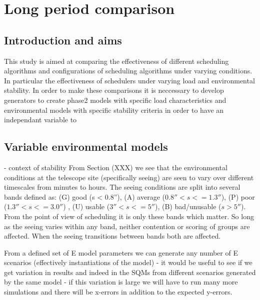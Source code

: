 \section{Long period comparison}
\label{sect:lts_study}

\subsection{Introduction and aims}
This study is aimed at comparing the effectiveness of different scheduling algorithms and configurations of scheduling algorithms under varying conditions. In particular the effectiveness of schedulers under varying load and environmental stability. In order to make these comparisons it is neccessary to develop generators to create phase2 models with specific load characteristics and environmental models with specific stability criteria in order to have an independant variable to 


\subsection{Variable environmental models}
- context of stability 
From Section (XXX) we see that the environmental conditions at the telescope site (specifically seeing) are seen to vary over different timescales from minutes to hours. The seeing conditions are split into several bands defined as: (G) good (s < 0.8''), (A) average ($0.8'' < s <= 1.3''$), (P) poor ($1.3'' < s <= 3.0''$) , (U) usable ($3'' < s <= 5''$), (B) bad/unusable ($s > 5''$). From the point of view of scheduling it is only these bands which matter. So long as the seeing varies within any band, neither contention or scoring of groups are affected. When the seeing transitions between bands both are affected. 

From a defined set of E model parameters we can generate any number of E scenarios (effectively instantiations of the model) - it would be useful to see if we get variation in results and indeed in the SQMs from different scenarios generated by the same model - if this variation is large we will have to run many more simulations and there will be x-errors in addition to the expected y-errors.

